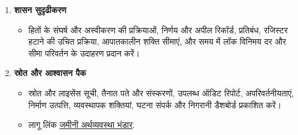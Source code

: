 \documentclass[11pt]{article}
\begin{document}
\begin{enumerate}[leftmargin=*]
\begin{itemize}[leftmargin=*]
\item दस्तावेज क्षेत्राधिकार रणनीति, वाउचर वर्ग, नकद समकक्ष नीति, KYC या प्रमाणन विकल्प, भू-सीमांकन, उपभोक्ता प्रकटीकरण, गलत बिक्री नियंत्रण और सामान्य पूल स्वैप और एक्सप्रेस क्रेडिट उत्पाद के बीच अंतर।
\item प्रभावी को जोड़ें \href{https://docs.cosmolocal.credit/hi/governance/terms}{Cosmo-Local Credit सेवा की शर्तें} और नियंत्रित रिकॉर्ड के माध्यम से प्रतिस्थापित संस्करणों को संरक्षित करें।
\end{itemize}
\item \textbf{शासन सुदृढीकरण}
\begin{itemize}[leftmargin=*]
\item हितों के संघर्ष और अस्वीकरण की प्रक्रियाओं, निर्णय और अपील रिकॉर्ड, प्रतिबंध, रजिस्टर हटाने की उचित प्रक्रिया, आपातकालीन शक्ति सीमाएं, और समय में लॉक विनिमय दर और सीमा परिवर्तन के उदाहरण प्रदान करें।
\end{itemize}
\item \textbf{स्रोत और आश्वासन पैक}
\begin{itemize}[leftmargin=*]
\item स्रोत और लाइसेंस सूची, तैनात पते और संस्करणों, उपलब्ध ऑडिट रिपोर्ट, अपरिवर्तनीयताएं, निर्माण उत्पत्ति, व्यवस्थापक शक्तियां, घटना संपर्क और निगरानी डैशबोर्ड प्रकाशित करें।
\item लागू लिंक \href{https://github.com/grassrootseconomics}{जमीनी अर्थव्यवस्था भंडार}.
\end{itemize}
\end{enumerate}
\end{document}
